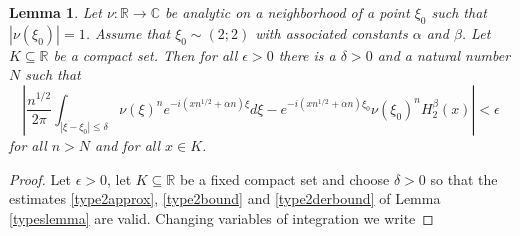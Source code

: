 \documentclass{article}
\theoremstyle{theorem}
\newtheorem{lemma}[theorem]{Lemma}
\theoremstyle{remark}
\begin{document}
\begin{lemma}\label{hardlemma22}
Let $\nu:\mathbb{R}\rightarrow \mathbb{C}$ be analytic on a neighborhood of a point $\xi_0$ such that $|\nu(\xi_0)|=1$. Assume that $\xi_0\sim(2;2)$ with associated constants $\alpha$ and $\beta$. Let $K\subseteq \mathbb{R}$ be a compact set. Then for all $\epsilon>0$ there is a $\delta>0$ and a natural number $N$ such that 
\begin{equation}
\left|\frac{n^{1/2}}{2\pi}\int_{|\xi-\xi_0|\leq \delta}\nu(\xi)^ne^{-i(xn^{1/2}+\alpha n)\xi}d\xi-e^{-i(xn^{1/2}+\alpha n)\xi_0}\nu(\xi_0)^n H_2^{\beta}(x)\right|<\epsilon
\end{equation}
for all $n>N$ and for all $x\in K$.
\end{lemma}
\begin{proof}
Let $\epsilon>0$, let $K\subseteq\mathbb{R}$ be a fixed compact set and choose $\delta>0$ so that the estimates \eqref{type2approx}, \eqref{type2bound} and \eqref{type2derbound} of Lemma \ref{typeslemma} are valid. Changing variables of integration we write


\end{proof}
\end{document}
